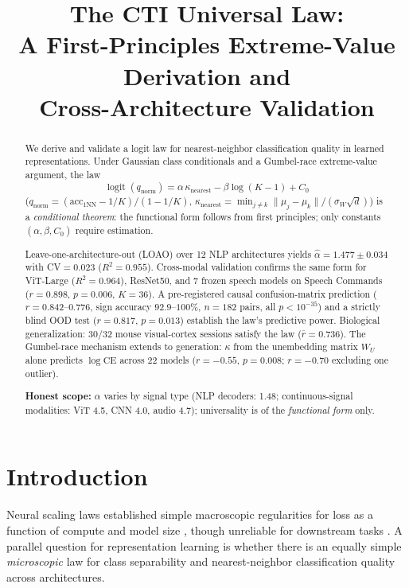 \documentclass{article}
\title{The CTI Universal Law:\\
A First-Principles Extreme-Value Derivation and\\
Cross-Architecture Validation}
\author{}
\DeclareMathOperator{\logit}{logit}
\begin{document}
\ifcolmsubmission
\linenumbers
\fi
\maketitle

\begin{abstract}
We derive and validate a logit law for nearest-neighbor classification quality in learned representations.
Under Gaussian class conditionals and a Gumbel-race extreme-value argument, the law
\begin{equation*}
\logit(q_{\mathrm{norm}})=\alpha\,\kappa_{\mathrm{nearest}}-\beta\log(K-1)+C_0
\end{equation*}
($q_{\mathrm{norm}}=(\mathrm{acc}_{1\mathrm{NN}}-1/K)/(1-1/K)$, $\kappa_{\mathrm{nearest}}=\min_{j\neq k}\|\mu_j-\mu_k\|/(\sigma_W\sqrt{d})$)
is a \emph{conditional theorem}: the functional form follows from first principles; only constants $(\alpha,\beta,C_0)$ require estimation.

Leave-one-architecture-out (LOAO) over 12 NLP architectures yields $\hat\alpha=1.477\pm0.034$ with CV$=0.023$ ($R^2=0.955$).
Cross-modal validation confirms the same form for ViT-Large ($R^2=0.964$), ResNet50, and 7 frozen speech models on Speech Commands ($r=0.898$, $p=0.006$, $K=36$).
A pre-registered causal confusion-matrix prediction ($r=0.842$--$0.776$, sign accuracy $92.9$--$100\%$, $n=182$ pairs, all $p<10^{-35}$) and a strictly blind OOD test ($r=0.817$, $p=0.013$) establish the law's predictive power.
Biological generalization: 30/32 mouse visual-cortex sessions satisfy the law ($\bar{r}=0.736$).
The Gumbel-race mechanism extends to generation: $\kappa$ from the unembedding matrix $W_U$ alone predicts $\log\mathrm{CE}$ across 22 models ($r=-0.55$, $p=0.008$; $r=-0.70$ excluding one outlier).

\textbf{Honest scope:} $\alpha$ varies by signal type (NLP decoders: 1.48; continuous-signal modalities: ViT 4.5, CNN 4.0, audio 4.7); universality is of the \emph{functional form} only.
\end{abstract}

\section{Introduction}
Neural scaling laws established simple macroscopic regularities for loss as a function of compute and model size \citep{kaplan2020,hoffmann2022}, though unreliable for downstream tasks \citep{lourie2025scaling}. A parallel question for representation learning is whether there is an equally simple \emph{microscopic} law for class separability and nearest-neighbor classification quality across architectures.
\end{document}
